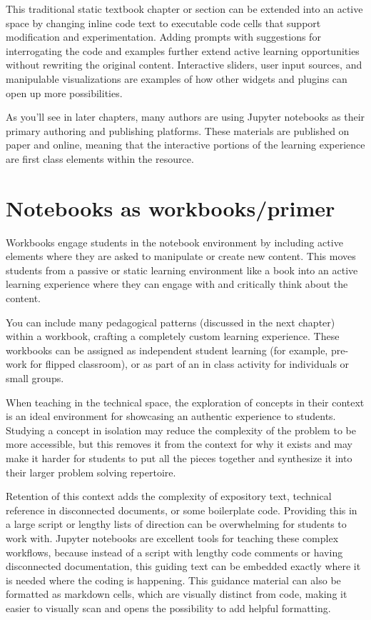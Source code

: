 \documentclass[]{book}
\begin{document}
This traditional static textbook chapter or section can be extended into
an active space by changing inline code text to executable code cells
that support modification and experimentation. Adding prompts with
suggestions for interrogating the code and examples further extend
active learning opportunities without rewriting the original content.
Interactive sliders, user input sources, and manipulable visualizations
are examples of how other widgets and plugins can open up more
possibilities.

As you'll see in later chapters, many authors are using Jupyter
notebooks as their primary authoring and publishing platforms. These
materials are published on paper and online, meaning that the
interactive portions of the learning experience are first class elements
within the resource.

\section{Notebooks as
workbooks/primer}\label{notebooks-as-workbooksprimer}

Workbooks engage students in the notebook environment by including
active elements where they are asked to manipulate or create new
content. This moves students from a passive or static learning
environment like a book into an active learning experience where they
can engage with and critically think about the content.

You can include many pedagogical patterns (discussed in the next
chapter) within a workbook, crafting a completely custom learning
experience. These workbooks can be assigned as independent student
learning (for example, pre-work for flipped classroom), or as part of an
in class activity for individuals or small groups.

When teaching in the technical space, the exploration of concepts in
their context is an ideal environment for showcasing an authentic
experience to students. Studying a concept in isolation may reduce the
complexity of the problem to be more accessible, but this removes it
from the context for why it exists and may make it harder for students
to put all the pieces together and synthesize it into their larger
problem solving repertoire.

Retention of this context adds the complexity of expository text,
technical reference in disconnected documents, or some boilerplate code.
Providing this in a large script or lengthy lists of direction can be
overwhelming for students to work with. Jupyter notebooks are excellent
tools for teaching these complex workflows, because instead of a script
with lengthy code comments or having disconnected documentation, this
guiding text can be embedded exactly where it is needed where the coding
is happening. This guidance material can also be formatted as markdown
cells, which are visually distinct from code, making it easier to
visually scan and opens the possibility to add helpful formatting.
\end{document}
